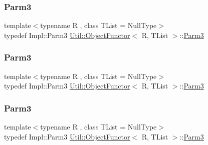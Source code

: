 \mbox{\label{classUtil_1_1ObjectFunctor_a6becd26610c6091b9ba93cd96f3def66}} 
\subsubsection{\texorpdfstring{Parm3}{Parm3}\hspace{0.1cm}{\footnotesize\ttfamily [1/3]}}
{\footnotesize\ttfamily template$<$typename R , class T\+List  = Null\+Type$>$ \\
typedef Impl\+::\+Parm3 \mbox{\hyperlink{classUtil_1_1ObjectFunctor}{Util\+::\+Object\+Functor}}$<$ R, T\+List $>$\+::\mbox{\hyperlink{classUtil_1_1ObjectFunctor_a6becd26610c6091b9ba93cd96f3def66}{Parm3}}}

\mbox{\label{classUtil_1_1ObjectFunctor_a6becd26610c6091b9ba93cd96f3def66}} 
\subsubsection{\texorpdfstring{Parm3}{Parm3}\hspace{0.1cm}{\footnotesize\ttfamily [2/3]}}
{\footnotesize\ttfamily template$<$typename R , class T\+List  = Null\+Type$>$ \\
typedef Impl\+::\+Parm3 \mbox{\hyperlink{classUtil_1_1ObjectFunctor}{Util\+::\+Object\+Functor}}$<$ R, T\+List $>$\+::\mbox{\hyperlink{classUtil_1_1ObjectFunctor_a6becd26610c6091b9ba93cd96f3def66}{Parm3}}}

\mbox{\label{classUtil_1_1ObjectFunctor_a6becd26610c6091b9ba93cd96f3def66}} 
\subsubsection{\texorpdfstring{Parm3}{Parm3}\hspace{0.1cm}{\footnotesize\ttfamily [3/3]}}
{\footnotesize\ttfamily template$<$typename R , class T\+List  = Null\+Type$>$ \\
typedef Impl\+::\+Parm3 \mbox{\hyperlink{classUtil_1_1ObjectFunctor}{Util\+::\+Object\+Functor}}$<$ R, T\+List $>$\+::\mbox{\hyperlink{classUtil_1_1ObjectFunctor_a6becd26610c6091b9ba93cd96f3def66}{Parm3}}}

